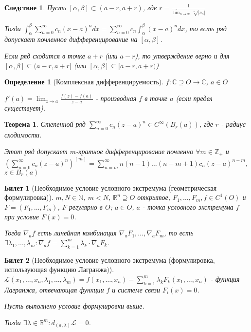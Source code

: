 \documentclass[11pt,a4paper,oneside]{scrartcl}
\newcommand{\Z}{\mathbb{Z}}
\newcommand{\R}{\mathbb{R}}
\newcommand{\Cx}{\mathbb{C}}
\newcommand{\Lagr}{\mathcal{L}}
\newtheorem{definition}{Определение}
\newtheorem*{theorem}{Теорема}
\newtheorem{consequence}{Следствие}
\newtheorem{ticket}{Билет}
\begin{document}
\setcounter{consequence}{0}
\begin{consequence}
    Пусть $[\alpha, \beta] \subset (a - r, a + r)$, где
    $r = \frac{1}{\overline{\lim}_{n \rightarrow \infty} \sqrt[n]{|c_n|}}$

    Тогда $\int_\alpha^\beta \sum_{n=0}^\infty c_n (x-a)^n dx
    = \sum_{n=0}^\infty c_n \int_\alpha^\beta (x-a)^n dx$,
    то есть ряд допускает почленное дифференцирование на $[\alpha, \beta]$.

    Если ряд сходится в точке $a + r$ (или $a - r$), то утверждение верно
    и для $[\alpha, \beta] \subseteq (a - r, a + r]$
    (или $[\alpha, \beta] \subseteq [a - r, a + r)$)
\end{consequence}

\begin{definition}[Комплексная дифференцируемость]
    $f: \Cx \supseteq O \rightarrow \Cx$, $a \in O$

    $f'(a) = \lim_{z \rightarrow a} \frac{f(z) - f(a)}{z - a}$
    - производная $f$ в точке $a$ (если предел существует).
\end{definition}

\begin{theorem}
    Степенной ряд $\sum_{n=0}^\infty c_n (z-a)^n \in C^\infty (B_r(a))$,
    где $r$ - радиус сходимости.

    Этот ряд допускает $m$-кратное дифференцирование почленно $\forall m \in \Z_+$
    и $(\sum_{n=0}^\infty c_n (z-a)^n)^{(m)} =
    \sum_{n=m}^\infty n (n-1) \dots (n-m+1) c_n (z-a)^{n-m}$, $z \in B_r(a)$
\end{theorem}

\setcounter{ticket}{21}
\addtocounter{ticket}{-1}
\begin{ticket}[Необходимое условие условного экстремума (геометрическая формулировка)]
    $m, N \in \mathbb{N}$, $m < N$, $\mathbb{R}^n \supseteq O$ открытое,
    $F_1, \dots, F_m, f \in C^1(O)$ и $F = (F_1, \dots, F_m)$, $F$ регулярно в $O$;
    $a \in O$, $a$ - точка условного экстремума $f$ при условие $F(x) = 0$.

    Тогда $\nabla_a f$ есть линейная комбинация $\nabla_a F_1, \dots, \nabla_a F_m$,
    то есть $\exists \lambda_1, \dots, \lambda_m:
        \nabla_a f = \sum_{k=1}^m \lambda_k \cdot \nabla_a F_k$.
\end{ticket}

\addtocounter{ticket}{-1}
\begin{ticket}[Необходимое условие условного экстремума (формулировка,
        использующая функцию Лагранжа)]
    $\Lagr(x_1, \dots, x_n, \lambda_1, \dots, \lambda_m)
        = f(x_1, \dots, x_n) - \sum_{k=1}^m \lambda_k F_k(x_1, \dots, x_n)$
    - функция Лагранжа, отвечающая функции $f$ и системе связи $F_i(x) = 0$.

    Пусть выполнено условие формулировки выше.

    Тогда $\exists \lambda \in \R^m : d_{(a, \lambda)} \Lagr = 0$.
\end{ticket}
\end{document}
